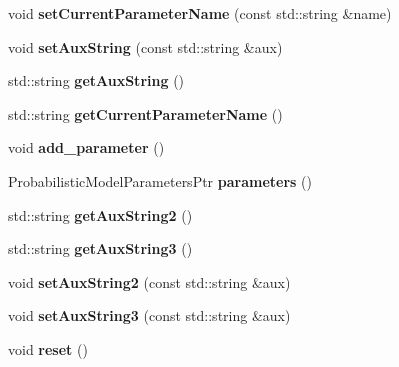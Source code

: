 \begin{DoxyCompactItemize}
\item 
\mbox{\label{classtops_1_1ConfigurationReader_af49b5bdb58a47c5bb1a398ad89168a2e}} 
void {\bfseries set\+Current\+Parameter\+Name} (const std\+::string \&name)
\item 
\mbox{\label{classtops_1_1ConfigurationReader_a8624fe6b02112a60e5f3c7542efc91aa}} 
void {\bfseries set\+Aux\+String} (const std\+::string \&aux)
\item 
\mbox{\label{classtops_1_1ConfigurationReader_a36e5cc1447a21428ab2628902d22c42b}} 
std\+::string {\bfseries get\+Aux\+String} ()
\item 
\mbox{\label{classtops_1_1ConfigurationReader_afa314d7735d36bea1a12ae6bb26ec1d8}} 
std\+::string {\bfseries get\+Current\+Parameter\+Name} ()
\item 
\mbox{\label{classtops_1_1ConfigurationReader_ac8e03c9cdc40def083259aa12f34cdc0}} 
void {\bfseries add\+\_\+parameter} ()
\item 
\mbox{\label{classtops_1_1ConfigurationReader_a0aa802b5da8aeb58aba4efc545605f96}} 
Probabilistic\+Model\+Parameters\+Ptr {\bfseries parameters} ()
\item 
\mbox{\label{classtops_1_1ConfigurationReader_a62a3e63f200aaab2bc40632e9f72901a}} 
std\+::string {\bfseries get\+Aux\+String2} ()
\item 
\mbox{\label{classtops_1_1ConfigurationReader_ab99963ac7f054d76ebbc460414d42b2a}} 
std\+::string {\bfseries get\+Aux\+String3} ()
\item 
\mbox{\label{classtops_1_1ConfigurationReader_a2871b540b10ca59481aba23376cb1956}} 
void {\bfseries set\+Aux\+String2} (const std\+::string \&aux)
\item 
\mbox{\label{classtops_1_1ConfigurationReader_aee34b8155b6073c5f5a71ba0566fa9f2}} 
void {\bfseries set\+Aux\+String3} (const std\+::string \&aux)
\item 
\mbox{\label{classtops_1_1ConfigurationReader_a7388cba24ec0bd639b47cabdbfdca7d8}} 
void {\bfseries reset} ()
\end{DoxyCompactItemize}


